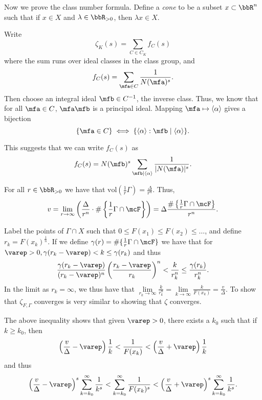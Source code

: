\documentclass[a4paper, 12pt,oneside,openany]{book}
\begin{document}
Now we prove the class number formula. Define a \emph{cone} to be a subset $x \subset \bbR^n$ such that if $x\in X$ and $\lambda \in \bbR_{>0}$, then $\lambda x \in X$.


 Write $$\zeta_K(s)=\sum\limits_{C \in C_K} f_C(s)$$ where the sum runs over ideal classes in the class group, and $$f_C(s) = \sum\limits_{\mfa \in C} \frac{1}{N(\mfa)^s}.$$ Then choose an integral ideal $\mfb \in C^{-1}$, the inverse class. Thus, we know that for all $\mfa \in C$, $\mfa\mfb$ is a principal ideal. Mapping $\mfa \mapsto \langle \alpha \rangle$ gives a bijection $$\{\mfa \in C\} \iff \{\langle \alpha \rangle:  \mfb \mid \langle \alpha \rangle\}.$$

This suggests that we can write $f_C(s)$ as $$f_C(s) = N(\mfb)^s \sum\limits_{\mfb \mid \langle \alpha \rangle} \frac{1}{|N(\mfa)|^s}.$$ 

For all $r \in \bbR_{>0}$ we have that $\text{vol}(\frac{1}{r}\Gamma)=\frac{\Delta}{r^n}.$ Thus, 
$$v=\lim\limits_{r\to\infty} \left(\frac{\Delta}{r^n} \cdot \#\left\{\frac{1}{r}\Gamma \cap \mcF\right\}\right)= \Delta \frac{\#\left\{\frac{1}{r}\Gamma \cap \mcF\right\}}{r^n}.$$

Label the points of $\Gamma \cap X$ such that $0\leq F(x_1) \leq F(x_2) \leq \dots$, and define $r_k = F(x_k)^{\frac{1}{n}}$. If we define $\gamma(r)=\#\{\frac{1}{r}\Gamma \cap \mcF\}$ we have that for $\varep > 0, \gamma(r_k-\varep)<k\leq \gamma(r_k)$ and thus $$\frac{\gamma(r_k-\varep)}{(r_k-\varep)^n}\left(\frac{r_k-\varep}{r_k}\right)^n<\frac{k}{r^n_k}\leq \frac{\gamma(r_k)}{r^n_k}.$$ In the limit as $r_k=\infty$, we thus have that $\lim\limits_{r_k\to\infty}\frac{k}{r^n_k}=\lim\limits_{k\to\infty}\frac{k}{F(x_k)}=\frac{v}{\Delta}$. To show that $\zeta_{F, \Gamma}$ converges is very similar to showing that $\zeta$ converges. 

The above inequality shows that given $\varep>0$, there exists a $k_0$ such that if $k\geq k_0$, then $$\left(\frac{v}{\Delta}-\varep\right)\frac{1}{k}<\frac{1}{F(x_k)}<\left(\frac{v}{\Delta}+\varep\right)\frac{1}{k}$$ and thus $$\left(\frac{v}{\Delta}-\varep\right)^s \sum\limits_{k=k_0}^\infty \frac{1}{k^s}< \sum\limits_{k=k_0}^\infty \frac{1}{F(x_k)^s}<\left(\frac{v}{\Delta}+\varep\right)^s \sum\limits_{k=k_0}^\infty\frac{1}{k^s}.$$
\end{document}
